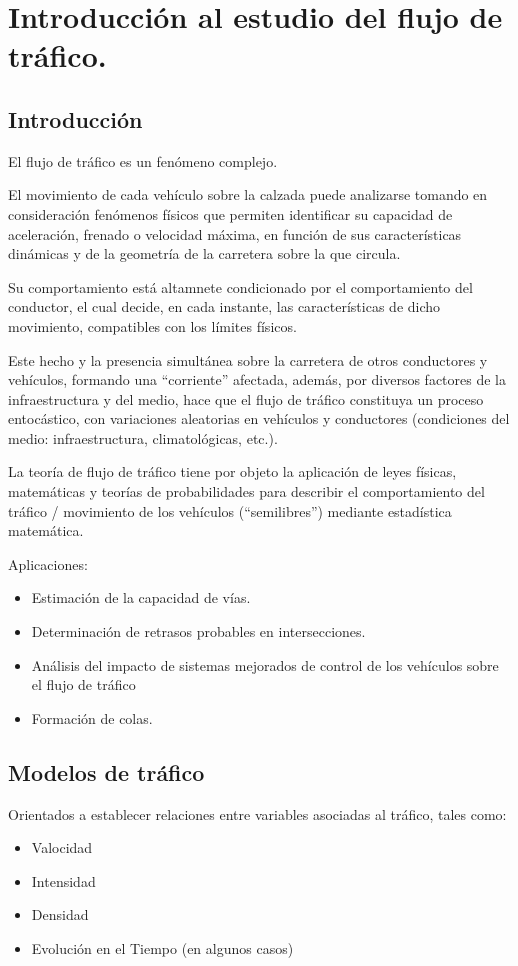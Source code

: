 \chapter{Introducción al estudio del flujo de tráfico.}
\section{Introducción}
El flujo de tráfico es un fenómeno complejo. 

El movimiento de cada vehículo sobre la calzada puede analizarse tomando en consideración fenómenos físicos que permiten identificar su capacidad de aceleración, frenado o velocidad máxima, en función de sus características dinámicas y de la geometría de la carretera sobre la que circula.

Su comportamiento está altamnete condicionado por el comportamiento del conductor, el cual decide, en cada instante, las características de dicho movimiento, compatibles con los límites físicos.

Este hecho y la presencia simultánea sobre la carretera de otros conductores y vehículos, formando una ``corriente'' afectada, además, por diversos factores de la infraestructura y del medio, hace que el flujo de tráfico constituya un proceso entocástico, con variaciones aleatorias en vehículos y conductores (condiciones del medio: infraestructura, climatológicas, etc.).

La teoría de flujo de tráfico tiene por objeto la aplicación de leyes físicas, matemáticas y teorías de probabilidades para describir el comportamiento del tráfico / movimiento de los vehículos (``semilibres'') mediante estadística matemática.

Aplicaciones:
\begin{itemize}
    \item Estimación de la capacidad de vías.
    \item Determinación de retrasos probables en intersecciones.
    \item Análisis del impacto de sistemas mejorados de control de los vehículos sobre el flujo de tráfico
    \item Formación de colas.
\end{itemize}

\section{Modelos de tráfico}

Orientados a establecer relaciones entre variables asociadas al tráfico, tales como:
\begin{itemize}
    \item Valocidad
    \item Intensidad
    \item Densidad
    \item Evolución en el Tiempo (en algunos casos)
\end{itemize}

